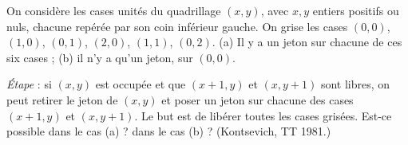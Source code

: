 On considère les cases unités du quadrillage $(x, y)$, avec $x, y$ entiers positifs ou nuls, chacune repérée par son coin inférieur gauche. On grise les cases $(0, 0)$, $(1, 0)$, $(0, 1)$, $(2, 0)$, $(1, 1)$, $(0, 2)$. (a) Il y a un jeton sur chacune de ces six cases ; (b) il n'y a qu'un jeton, sur $(0, 0)$.

\emph{Étape} : si $(x, y)$ est occupée et que $(x + 1, y)$ et $(x, y + 1)$ sont libres, on peut retirer le jeton de $(x, y)$ et poser un jeton sur chacune des cases $(x + 1, y)$ et $(x, y + 1)$. Le but est de libérer toutes les cases grisées. Est-ce possible dans le cas (a) ? dans le cas (b) ? (Kontsevich, TT 1981.)
